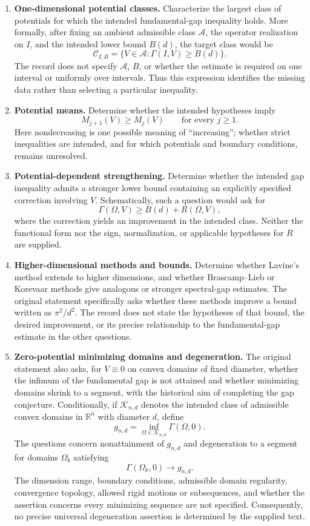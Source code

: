 \documentclass[11pt]{article}
\newcommand{\R}{\mathbb{R}}
\begin{document}
\begin{enumerate}
\item \textbf{One-dimensional potential classes.} Characterize the largest class of potentials for which the intended fundamental-gap inequality holds. More formally, after fixing an ambient admissible class \(\mathcal A\), the operator realization on \(I\), and the intended lower bound \(B(d)\), the target class would be
\[
\mathcal C_{I,B}
=\{V\in\mathcal A:\Gamma(I,V)\geq B(d)\}.
\]
The record does not specify \(\mathcal A\), \(B\), or whether the estimate is required on one interval or uniformly over intervals. Thus this expression identifies the missing data rather than selecting a particular inequality.

\item \textbf{Potential means.} Determine whether the intended hypotheses imply
\[
M_{j+1}(V)\geq M_j(V)\qquad\text{for every }j\geq1.
\]
Here nondecreasing is one possible meaning of ``increasing''; whether strict inequalities are intended, and for which potentials and boundary conditions, remains unresolved.

\item \textbf{Potential-dependent strengthening.} Determine whether the intended gap inequality admits a stronger lower bound containing an explicitly specified correction involving \(V\). Schematically, such a question would ask for
\[
\Gamma(\Omega,V)\geq B(d)+R(\Omega,V),
\]
where the correction yields an improvement in the intended class. Neither the functional form nor the sign, normalization, or applicable hypotheses for \(R\) are supplied.

\item \textbf{Higher-dimensional methods and bounds.} Determine whether Lavine's method extends to higher dimensions, and whether Brascamp--Lieb or Korevaar methods give analogous or stronger spectral-gap estimates. The original statement specifically asks whether these methods improve a bound written as \(\pi^2/d^2\). The record does not state the hypotheses of that bound, the desired improvement, or its precise relationship to the fundamental-gap estimate in the other questions.

\item \textbf{Zero-potential minimizing domains and degeneration.} The original statement also asks, for \(V\equiv0\) on convex domains of fixed diameter, whether the infimum of the fundamental gap is not attained and whether minimizing domains shrink to a segment, with the historical aim of completing the gap conjecture. Conditionally, if \(\mathcal K_{n,d}\) denotes the intended class of admissible convex domains in \(\R^n\) with diameter \(d\), define
\[
g_{n,d}=\inf_{\Omega\in\mathcal K_{n,d}}\Gamma(\Omega,0).
\]
The questions concern nonattainment of \(g_{n,d}\) and degeneration to a segment for domains \(\Omega_k\) satisfying
\[
\Gamma(\Omega_k,0)\longrightarrow g_{n,d}.
\]
The dimension range, boundary conditions, admissible domain regularity, convergence topology, allowed rigid motions or subsequences, and whether the assertion concerns every minimizing sequence are not specified. Consequently, no precise universal degeneration assertion is determined by the supplied text.
\end{enumerate}
\end{document}
